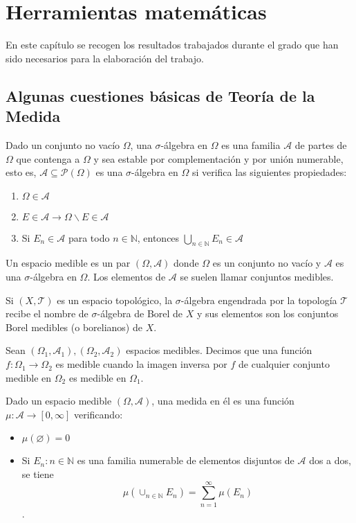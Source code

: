 \chapter{Herramientas matemáticas}\label{ch:segundo-capitulo}
En este capítulo se recogen los resultados trabajados durante el grado que han sido necesarios para la elaboración del trabajo.
\section{Algunas cuestiones básicas de Teoría de la Medida}
\begin{definicion}
Dado un conjunto no vacío $\Omega$, una $\sigma$-álgebra en $\Omega$ es una familia $\mathcal{A}$ de partes de $\Omega$ que contenga a $\Omega$ y sea estable por complementación y por unión numerable, esto es, $\mathcal{A} \subseteq \mathcal{P}(\Omega)$ es una $\sigma$-álgebra en $\Omega$ si verifica las siguientes propiedades:
\begin{enumerate}
	\item $\Omega\in\mathcal{A}$
	\item $E\in\mathcal{A} \rightarrow \Omega \backslash E \in \mathcal{A}$
	\item Si $E_{n}\in\mathcal{A}$ para todo $n\in\mathds{N}$, entonces $\bigcup_{n\in\mathds{N}}E_{n}\in\mathcal{A}$
\end{enumerate}
Un espacio medible es un par $(\Omega,\mathcal{A})$ donde $\Omega$ es un conjunto no vacío y $\mathcal{A}$ es una $\sigma$-álgebra en $\Omega$. Los elementos de $\mathcal{A}$ se suelen llamar conjuntos medibles.
\end{definicion}

\begin{definicion}
Si $(X,\mathcal{T})$ es un espacio topológico, la $\sigma$-álgebra engendrada por la topología $\mathcal{T}$ recibe el nombre de $\sigma$-álgebra de Borel de $X$ y sus elementos son los conjuntos Borel medibles (o borelianos) de $X$.
\end{definicion}

\begin{definicion}
Sean $(\Omega_{1},\mathcal{A}_{1}), (\Omega_{2},\mathcal{A}_{2})$ espacios medibles. Decimos que una función $f:\Omega_{1}\rightarrow\Omega_{2}$ es medible cuando la imagen inversa por $f$ de cualquier conjunto medible en $\Omega_{2}$ es medible en $\Omega_{1}$.
\end{definicion}

\begin{definicion}
Dado un espacio medible $(\Omega,\mathcal{A})$, una medida en él es una función $\mu:\mathcal{A}\rightarrow[0,\infty]$ verificando: 
\begin{itemize}
	\item $\mu(\varnothing)= 0 $
	\item Si ${E_{n} : n\in \mathds{N} }$ es una familia numerable de elementos disjuntos de $\mathcal{A}$ dos a dos, se tiene $$ \mu(\cup_{n\in\mathds{N}}E_{n}) = \sum_{n=1}^{\infty} \mu(E_{n})$$.
\end{itemize}
\end{definicion}

